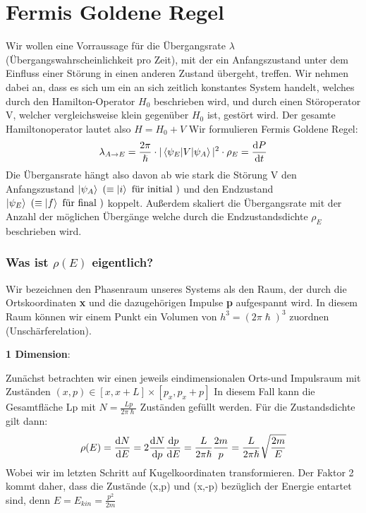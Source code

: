 \documentclass[Ex4_Zusammenfassung.tex]{subfiles}
\begin{document}
\section{Fermis Goldene Regel}
Wir wollen eine Vorraussage für die Übergangsrate $ \lambda $ (Übergangswahrscheinlichkeit pro Zeit), mit der ein Anfangszustand unter dem Einfluss einer Störung in einen anderen Zustand übergeht, treffen. Wir nehmen dabei an, dass es sich um ein an sich zeitlich konstantes System handelt, welches durch den Hamilton-Operator $ H_0 $ beschrieben wird, und durch einen Störoperator V, welcher vergleichsweise klein gegenüber  $ H_0 $ ist, gestört wird. Der gesamte Hamiltonoperator lautet also $ H = H_0 + V $ \newline
Wir formulieren Fermis Goldene Regel: 
\begin{equation}
\lambda_{A\rightarrow E} = \frac{2\pi}{\hslash} \cdot |\braket{\psi_{E} | V |\psi_{A}}|^2 \cdot \rho_{E} = \frac{\mathrm{d} P}{\mathrm{d} t}
\end{equation}
Die Übergansrate hängt also davon ab wie stark die Störung V den Anfangszustand $\ket{\psi_A}\ \left( \equiv \ket{i} \text{ für initial } \right) $ und den Endzustand $ \ket{\psi_E }\ \left( \equiv \ket{f} \text{ für final } \right) $ koppelt. Außerdem skaliert die Übergangsrate mit der Anzahl der möglichen Übergänge welche durch die Endzustandsdichte $ \rho_{E} $ beschrieben wird. 

\subsubsection*{Was ist $\rho(E)$ eigentlich?}
Wir bezeichnen den Phasenraum unseres Systems als den Raum, der durch die Ortskoordinaten \textbf{x} und die dazugehörigen Impulse \textbf{p} aufgespannt wird. In diesem Raum können wir einem Punkt ein Volumen von $ h^3 = (2\pi \hslash)^3 $ zuordnen (Unschärferelation). \newline 

\textbf{1 Dimension}:

Zunächst betrachten wir einen jeweils eindimensionalen Orts-und Impulsraum mit Zuständen $ (x,p) \in  [x,x+L] \times [p_{x},p_{x}+p] $ In diesem Fall kann die Gesamtfläche Lp mit $ N = \frac{Lp}{2\pi \hslash} $ Zuständen gefüllt werden. Für die Zustandsdichte gilt dann: 
\begin{equation}
	 \rho(E) = \frac{\mathrm{d} N}{\mathrm{d} E} = 2 \frac{\mathrm{d} N}{\mathrm{d} p} \frac{\mathrm{d} p}{\mathrm{d} E} = \frac{L}{2\pi \hslash} \frac{2m}{p} =  \frac{L}{2\pi \hslash} \sqrt{\frac{2m}{E}} 
 \end{equation}
 Wobei wir im letzten Schritt auf Kugelkoordinaten transformieren. 
 Der Faktor 2 kommt daher, dass die Zustände (x,p) und (x,-p) bezüglich der Energie entartet sind, denn $ E = E_{kin} = \frac{p^2}{2m} $ \newline
 
\end{document}
